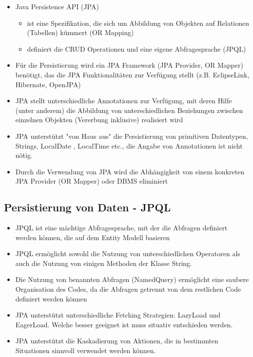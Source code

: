 \documentclass[a4paper]{article}
\begin{document}
			\begin{itemize}
				\item Java Persistence API (JPA)
					\begin{itemize}
						\item ist eine Spezifikation, die sich um Abbildung von Objekten auf Relationen (Tabellen) kümmert (OR Mapping)
						\item definiert die CRUD Operationen und eine eigene Abfragesprache (JPQL)
					\end{itemize}
				\item Für die Persistierung wird ein JPA Framework (JPA Provider, OR Mapper) benötigt, das die JPA Funktionalitäten zur Verfügung stellt (z.B. EclipseLink, Hibernate, OpenJPA)
				\item JPA stellt unterschiedliche Annotationen zur Verfügung, mit deren Hilfe (unter anderem) die Abbildung von unterschiedlichen Beziehungen zwischen einzelnen Objekten (Vererbung inklusive) realisiert wird
				\item JPA unterstützt "von Haus aus" die Persistierung von primitiven Datentypen, Strings, LocalDate , LocalTime etc., die Angabe von Annotationen ist nicht nötig.
				\item Durch die Verwendung von JPA wird die Abhängigkeit von einem konkreten JPA Provider (OR Mapper) oder DBMS eliminiert
			\end{itemize}
		
		\subsection{Persistierung von Daten - JPQL}
		
			\begin{itemize}
				\item JPQL ist eine mächtige Abfragesprache, mit der die Abfragen definiert werden können, die auf dem Entity Modell basieren
				\item JPQL ermöglicht sowohl die Nutzung von unterschiedlichen Operatoren als auch die Nutzung von einigen Methoden der Klasse String.
				\item Die Nutzung von benannten Abfragen (NamedQuery) ermöglicht eine saubere Organisation des Codes, da die Abfragen getrennt von dem restlichen Code definiert werden können
				\item JPA unterstützt unterschiedliche Fetching Strategien: LazyLoad und EagerLoad. Welche besser geeignet ist muss situativ entschieden werden.
				\item JPA unterstützt die Kaskadierung von Aktionen, die in bestimmten Situationen sinnvoll verwendet werden können.
			\end{itemize}
		
\end{document}
